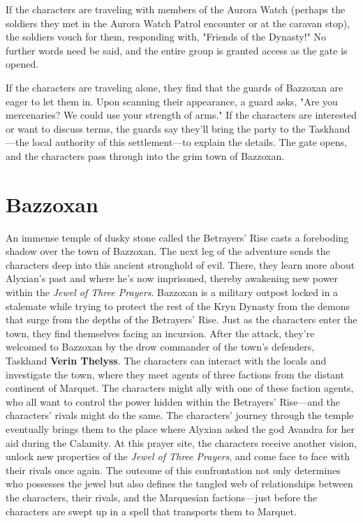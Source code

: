 \documentclass[a4paper, 11pt, bg=full, twocolumn, nooutline]{dndbook}
\begin{document}
If the characters are traveling with members of the Aurora Watch (perhaps the soldiers they met in the Aurora Watch Patrol encounter or at the caravan stop), the soldiers vouch for them, responding with, "Friends of the Dynasty!" No further words need be said, and the entire group is granted access as the gate is opened.

If the characters are traveling alone, they find that the guards of Bazzoxan are eager to let them in. Upon scanning their appearance, a guard asks, "Are you mercenaries? We could use your strength of arms." If the characters are interested or want to discuss terms, the guards say they'll bring the party to the Taskhand---the local authority of this settlement---to explain the details. The gate opens, and the characters pass through into the grim town of Bazzoxan.

\chapter{Bazzoxan}\label{ch:bazzoxan-4-4}

An immense temple of dusky stone called the Betrayers' Rise casts a foreboding shadow over the town of Bazzoxan. The next leg of the adventure sends the characters deep into this ancient stronghold of evil. There, they learn more about Alyxian's past and where he's now imprisoned, thereby awakening new power within the \textit{Jewel of Three Prayers}.
Bazzoxan is a military outpost locked in a stalemate while trying to protect the rest of the Kryn Dynasty from the demons that surge from the depths of the Betrayers' Rise. Just as the characters enter the town, they find themselves facing an incursion. After the attack, they're welcomed to Bazzoxan by the drow commander of the town's defenders, Taskhand \textbf{Verin Thelyss}.
The characters can interact with the locals and investigate the town, where they meet agents of three factions from the distant continent of Marquet. The characters might ally with one of these faction agents, who all want to control the power hidden within the Betrayers' Rise---and the characters' rivals might do the same. The characters' journey through the temple eventually brings them to the place where Alyxian asked the god Avandra for her aid during the Calamity.
At this prayer site, the characters receive another vision, unlock new properties of the \textit{Jewel of Three Prayers}, and come face to face with their rivals once again. The outcome of this confrontation not only determines who possesses the jewel but also defines the tangled web of relationships between the characters, their rivals, and the Marquesian factions---just before the characters are swept up in a spell that transports them to Marquet.
\end{document}
